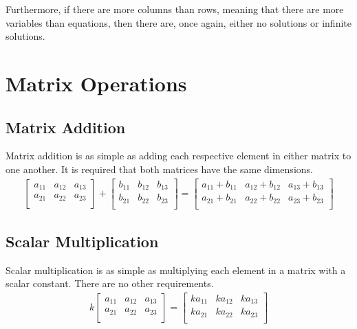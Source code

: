 \documentclass[11pt]{article}
\begin{document}
Furthermore, if there are more columns than rows, meaning that there are more variables than equations, then there are, once again, either no solutions or infinite solutions.

\section{Matrix Operations}

\subsection{Matrix Addition}

Matrix addition is as simple as adding each respective element in either matrix to one another. It is required that both matrices have the same dimensions.
\begin{align*}
    \begin{bmatrix}
        a_{11} & a_{12} & a_{13} \\
        a_{21} & a_{22} & a_{23} \\
    \end{bmatrix}
    +
    \begin{bmatrix}
        b_{11} & b_{12} & b_{13} \\
        b_{21} & b_{22} & b_{23} \\
    \end{bmatrix}
    =
    \begin{bmatrix}
        a_{11} + b_{11} & a_{12} + b_{12} & a_{13} + b_{13} \\
        a_{21} + b_{21} & a_{22} + b_{22} & a_{23} + b_{23} \\
    \end{bmatrix}
\end{align*}

\subsection{Scalar Multiplication}

Scalar multiplication is as simple as multiplying each element in a matrix with a scalar constant. There are no other requirements.
\begin{align*}
    k\begin{bmatrix}
        a_{11} & a_{12} & a_{13} \\
        a_{21} & a_{22} & a_{23} \\
    \end{bmatrix}
    =
    \begin{bmatrix}
        ka_{11} & ka_{12} & ka_{13} \\
        ka_{21} & ka_{22} & ka_{23} \\
    \end{bmatrix}
\end{align*}
\end{document}
